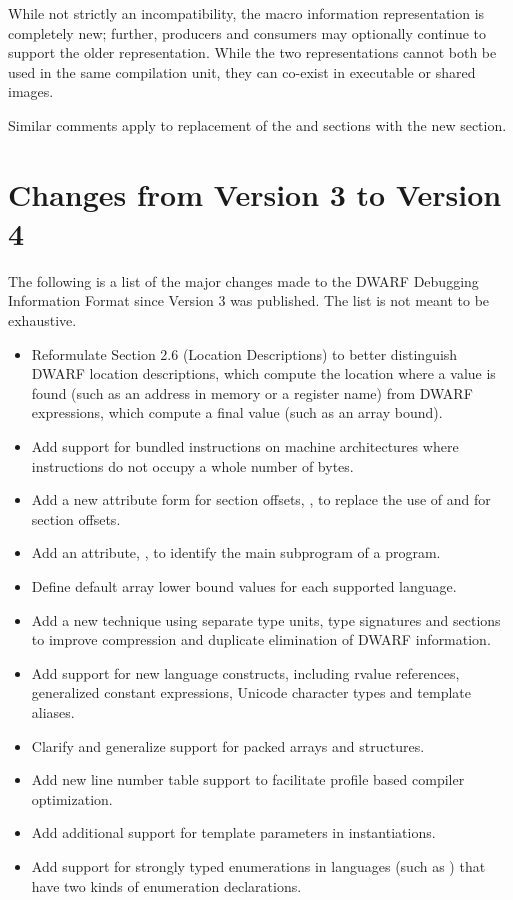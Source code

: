 While not strictly an incompatibility, the macro information 
representation is completely new; further, producers 
and consumers may optionally continue to support the older 
representation. While the two representations cannot both be 
used in the same compilation unit, they can co-exist in 
executable or shared images.

Similar comments apply to replacement of the \dotdebugpubnames{} 
and \dotdebugpubtypes{} sections with the new \dotdebugnames{} 
section.

\section{Changes from Version 3 to Version 4}
The following is a list of the major changes made to the 
DWARF Debugging Information Format since Version 3 was 
published. The list is not meant to be exhaustive.
\begin{itemize}
\item Reformulate 
Section 2.6 (Location Descriptions) 
to better distinguish DWARF location descriptions, which
compute the location where a value is found (such as an 
address in memory or a register name) from DWARF expressions, 
which compute a final value (such as an array bound).
\item Add support for bundled instructions on machine architectures 
where instructions do not occupy a whole number of bytes.
\item Add a new attribute form for section offsets, 
\DWFORMsecoffsetNAME,
to replace the use of 
\DWFORMdatafourNAME{} and \DWFORMdataeightNAME{} for section offsets.
\item Add an attribute, \DWATmainsubprogramNAME, to identify the main subprogram of a
program.
\item Define default array lower bound values for each supported language.
\item Add a new technique using separate type units, type signatures and \COMDAT{} sections to
improve compression and duplicate elimination of DWARF information.
\item Add support for new  language constructs, including rvalue references, generalized
constant expressions, Unicode character types and template aliases.
\item Clarify and generalize support for packed arrays and structures.
\item Add new line number table support to facilitate profile based compiler optimization.
\item Add additional support for template parameters in instantiations.
\item Add support for strongly typed enumerations in languages (such as ) that have two
kinds of enumeration declarations.
\end{itemize}
